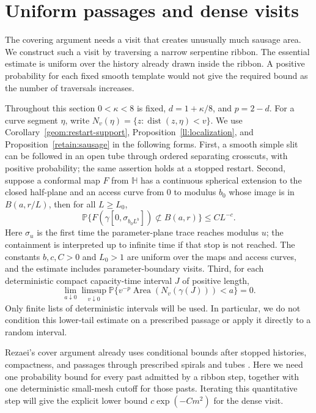 \section{Uniform passages and dense visits}
\label{rc:section}

The covering argument needs a visit that creates unusually much sausage
area.  We construct such a visit by traversing a narrow serpentine ribbon.
The essential estimate is uniform over the history already drawn inside
the ribbon.  A positive probability for each fixed smooth template would
not give the required bound as the number of traversals increases.

Throughout this section $0<\kappa<8$ is fixed,
$d=1+\kappa/8$, and $p=2-d$.  For a curve segment $\eta$, write
$N_v(\eta)=\{z:\operatorname{dist}(z,\eta)<v\}$.
We use Corollary~\ref{geom:restart-support}, Proposition~\ref{ll:localization}, and Proposition~\ref{retain:sausage} in the following forms.  First, a smooth simple
slit can be followed in an open tube through ordered separating
crosscuts, with positive probability; the same assertion holds at a
stopped restart. Second, suppose a conformal map $F$ from $\mathbb H$ has a
continuous spherical extension to the closed half-plane and an access
curve from $0$ to modulus $b_0$ whose image is in $B(a,r/L)$, then
for all $L\ge L_0$,
\begin{equation}\label{rc:localization-input}
 \mathbb P\{F(\gamma[0,\sigma_{b_0L^b}])
                    \not\subset B(a,r)\}\le C L^{-c}.
\end{equation}
Here $\sigma_u$ is the first time the parameter-plane trace reaches modulus
$u$; the containment is interpreted up to infinite time if that stop is
not reached.  The constants $b,c,C>0$ and $L_0>1$ are uniform over the
maps and access curves, and the estimate includes parameter-boundary
visits. Third, for
each deterministic compact capacity-time interval $J$ of positive length,
\begin{equation}\label{rc:sausage-input}
 \lim_{a\downarrow0}\limsup_{v\downarrow0}
   \mathbb P\{v^{-p}\operatorname{Area}(N_v(\gamma(J)))<a\}=0.
\end{equation}
Only finite lists of deterministic intervals will be used.  In
particular, we do not condition this lower-tail estimate on a prescribed
passage or apply it directly to a random interval.

Rezaei's cover argument already uses conditional bounds after stopped
histories, compactness, and passages through prescribed spirals and tubes
\cite[Section~3, Lemmas~3.1--3.3]{rezaei2018}. Here we need one
probability bound for every past admitted by a ribbon step, together
with one deterministic small-mesh cutoff for those pasts. Iterating
this quantitative step will give the explicit lower bound
$c\exp(-Cm^2)$ for the dense visit.

